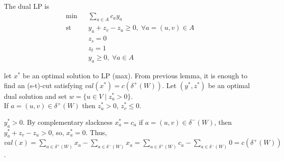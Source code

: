 \documentclass[main]{subfiles}
\begin{document}
The dual LP is 
\begin{equation*}
\begin{aligned}
& \min & & \sum_{a \in A} c_a y_a\\
& \text{st} & & y_a + z_v - z_u \geq 0, \; \forall a = (u,v) \in A \\
& & & z_s = 0 \\
& & & z_t = 1 \\
& & & y_a \geq 0, \; \forall a \in A
\end{aligned}
\end{equation*}

let $x^*$ be an optimal solution to LP (max). From previous lemma, it is enough
to find an (s-t)-cut satisfying $val(x^*) = c(\delta^+(W))$. Let $(y^*, z^*)$
be an optimal dual solution and set $w = \{ u \in V \mid z_u^* > 0\}$.\\
If $a=(u,v) \in \delta^+(W)$ then $z_u^* > 0$, $z_v^* \leq 0$.

$y^*_a > 0$. By complementary slackness $x^*_a = c_a$ if $a =(u,v) \in \delta^-
(W)$, then $y^*_a + z_v - z_u > 0$, so, $x^*_a = 0$. Thus, $val(x) = \sum_{a
\in \delta^+(W)} x_a - \sum_{a \in \delta^-(W)} x_a = \sum_{a \in \delta^+(W)}
c_a - \sum_{a \in \delta^-(W)} 0 = c(\delta^+(W))$.
\end{document}
